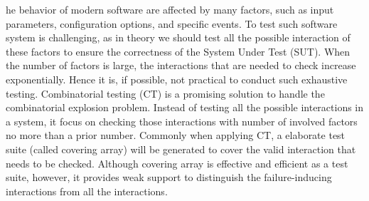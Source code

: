 \documentclass[10pt,journal,cspaper,compsoc]{IEEEtran}
\begin{document}
%
%
%
%
he behavior of modern software are affected by many factors, such as input parameters, configuration options, and specific events. To test such software system is challenging, as in theory we should test all the possible interaction of these factors to ensure the correctness of the System Under Test (SUT)\cite{song2012itree}. When the number of factors is large, the interactions that are needed to check increase exponentially. Hence it is, if possible, not practical to conduct such exhaustive testing. Combinatorial testing (CT) is a promising solution to handle the combinatorial explosion problem. Instead of testing all the possible interactions in a system, it focus on checking those interactions with number of involved factors no more than a prior number. Commonly when applying CT, a elaborate test suite (called covering array) will be generated to cover the valid interaction that needs to be checked. Although covering array is effective and efficient as a test suite, however, it provides weak support to distinguish the failure-inducing interactions from all the interactions.
\end{document}

